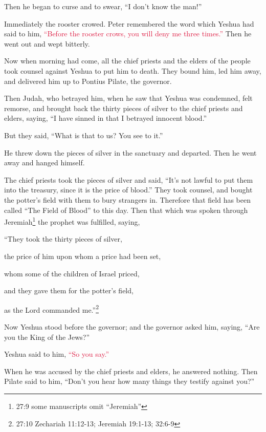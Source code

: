 \myverse{}Then he began to curse and to swear, “I don’t know the man!”

Immediately the rooster crowed.
\myverse{}Peter remembered the word which Yeshua had said to him,
\textcolor{crimson}{“Before the rooster crows, you will deny me three times.”} Then he went out and wept bitterly.


\mychapter{} \myverse*{}Now when morning had come, all the chief priests and the elders
of the people took counsel against Yeshua to put him to death.
\myverse{}They bound him, led him away, and delivered him up to Pontius Pilate, the governor.

\myverse{}Then Judah, who betrayed him, when he saw that Yeshua was condemned,
felt remorse, and brought back the thirty pieces of silver to the chief priests and elders,
\myverse{}saying, “I have sinned in that I betrayed innocent blood.”

But they said, “What is that to us? You see to it.”

\myverse{}He threw down the pieces of silver in the sanctuary and departed.
Then he went away and hanged himself.

\myverse{}The chief priests took the pieces of silver and said, “It’s not
lawful to put them into the treasury, since it is the price of blood.”
\myverse{}They took counsel, and bought the potter’s field with them to bury strangers
in.
\myverse{}Therefore that field has been called “The Field of Blood” to this day.
\myverse{}Then that which was spoken through Jeremiah\footnote{27:9 some manuscripts omit “Jeremiah”} the prophet was fulfilled, saying,

“They took the thirty pieces of silver,

the price of him upon whom a price had been set,

whom some of the children of Israel priced,

\myverse{}and they gave them for the potter’s field,

as the Lord commanded me.”\footnote{27:10 Zechariah 11:12-13;
	Jeremiah 19:1-13;
	32:6-9}

\myverse{}Now Yeshua stood before the governor; and the governor asked
him, saying, “Are you the King of the Jews?”

Yeshua said to him,
\textcolor{crimson}{“So you say.”}

\myverse{}When he was accused by the chief priests and elders, he answered
nothing.
\myverse{}Then Pilate said to him, “Don’t you hear how many things they testify against
you?”

